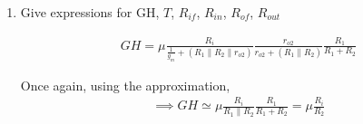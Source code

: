 \begin{enumerate}[label=\thesubsection.\arabic*.,ref=\thesubsection.\theenumi]
\begin{figure}[!ht]
	\begin{center}
		
		\resizebox{\columnwidth}{!}{}
	\end{center}
\caption{}
\label{fig:Complete_Circuit}
\end{figure}


\begin{align}
    R_{i}=R_{s}\|R_{i d}\|(R_{1}+R_{2})
\end{align}
\begin{align}
    V_{i}=I_{i} R_{i}
\end{align}
\begin{align}
    I_{o}=-\mu V_{i} \frac{1}{1 / g_{m}+(R_{1}\|R_{2}\| r_{o 2})} \frac{r_{o 2}}{r_{o 2}+(R_{1} \| R_{2})}
\end{align}
\begin{align}
    G = \frac{I_{o}}{I_{i}}=-\mu \frac{R_{i}}{1 / g_{m}+(R_{1}\|R_{2}\| r_{o 2})} \frac{r_{o 2}}{r_{o 2}+(R_{1} \| R_{2})}
\end{align}
We use the approximation
\begin{align}
    1 / g_{m} \ll (R_{1}\|R_{2}\| r_{o 2})
\end{align}
This is because the $\frac{1}{g_{m}}$ is in order of few \ohm s but, $R_{1}$, $R_{2}$ and $r_{o2}$ are in order of k\ohm s 

\begin{align}
    G =-\mu \frac{R_{i}}{R_{1} \| R_{2}}
\end{align}
\begin{align}
    R_{o}=r_{o 2}+(R_{1} \| R_{2})+(g_{m} r_{o 2})(R_{1} \| R_{2})
\end{align}
\begin{align}
    \implies R_{o} \simeq g_{m} r_{o 2}\left(R_{1} \| R_{2}\right)
\end{align}

\item
Give expressions for GH, $T$, $R_{if}$, $R_{in}$, $R_{of}$, $R_{out}$

\solution
\begin{align}
    GH=\mu \frac{R_{i}}{\frac{1}{g_{m}}+(R_{1}\|R_{2}\| r_{o 2})} \frac{r_{o 2}}{r_{o 2}+(R_{1} \| R_{2})} \frac{R_{1}}{R_{1}+R_{2}}
\end{align}

Once again, using the approximation,
\begin{align}
    \implies GH \simeq \mu \frac{R_{i}}{R_{1} \| R_{2}} \frac{R_{1}}{R_{1}+R_{2}}=\mu \frac{R_{i}}{R_{2}}
\end{align}


\end{enumerate}
